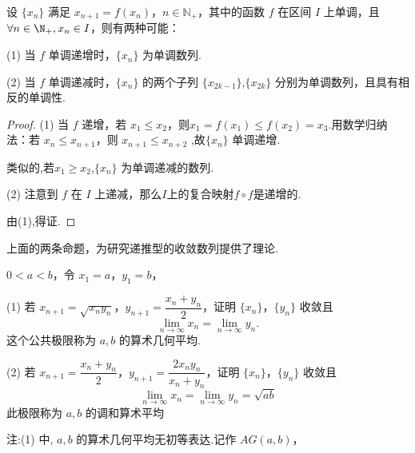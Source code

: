 \begin{proposition}
	设 $\{x_n\}$ 满足 $x_{n+1} = f(x_n)$，$n \in \mathbb{N}_+$，其中的函数 $f$ 在区间 $I$ 上单调，且$\forall n\in\N_+,x_n\in I$，则有两种可能：
	
	(1) 当 $f$ 单调递增时，$\{x_n\}$ 为单调数列.
	
	(2) 当 $f$ 单调递减时，$\{x_n\}$ 的两个子列 $\{x_{2k-1}\}$,$\{x_{2k}\}$ 分别为单调数列，且具有相反的单调性.
	
\end{proposition}
\begin{proof}
	(1) 当 $f$ 递增，若 $x_1 \leqslant x_2$，则$x_1=f(x_1) \leqslant f(x_2)=x_3$.用数学归纳法：若 $x_n \leqslant x_{n+1}$，则 $x_{n+1} \leqslant x_{n+2}$ ,故$\{x_n\}$ 单调递增.
	
	类似的,若$x_1\geqslant x_2$,$\{x_n\}$ 为单调递减的数列.
	
	(2) 注意到 $f$ 在 $I$ 上递减，那么$I$上的复合映射$f\circ f$是递增的.
	
	由(1),得证.
\end{proof}
上面的两条命题，为研究递推型的收敛数列提供了理论.




\begin{proposition}
	$0 < a < b$，令 $x_1 = a$，$y_1 = b$，
	
	(1) 若 $x_{n+1} = \sqrt{x_n y_n}$，$y_{n+1} = \dfrac{x_n + y_n}{2}$，证明 $\{x_n\}$，$\{y_n\}$ 收敛且
	\[
	\lim_{n \to \infty} x_n = \lim_{n \to \infty} y_n.
	\]
	这个公共极限称为 $a, b$ 的算术几何平均.
	
	(2) 若 $x_{n+1} = \dfrac{x_n + y_n}{2}$，$y_{n+1} = \dfrac{2x_n y_n}{x_n + y_n}$，证明 $\{x_n\}$，$\{y_n\}$ 收敛且
	\[
	\lim_{n \to \infty} x_n = \lim_{n \to \infty} y_n = \sqrt{ab}
	\]
	此极限称为 $a, b$ 的调和算术平均
\end{proposition}
注:(1) 中, $a, b$ 的算术几何平均无初等表达.记作 $AG(a, b)$，

